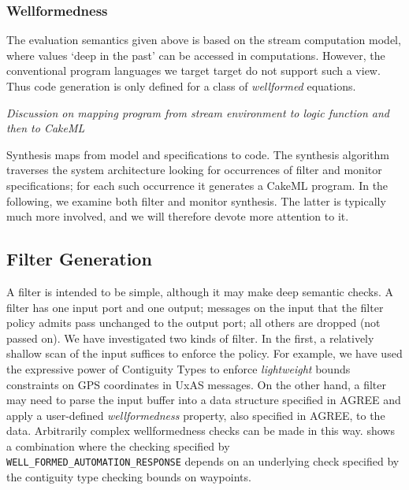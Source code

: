 \subsubsection*{Wellformedness}
The evaluation semantics given above is based on the stream
computation model, where values `deep in the past' can be accessed in
computations. However, the conventional program languages we target
target do not support such a view. Thus code generation is only
defined for a class of \emph{wellformed} equations.

\begin{definition}[Wellformedness]
\end{definition}

\emph{Discussion on mapping program from stream environment to logic function
and then to CakeML}

Synthesis maps from model and specifications to code. The synthesis
algorithm traverses the system architecture looking for occurrences of
filter and monitor specifications;  for each such occurrence it
generates a CakeML program. In the following, we examine both filter
and monitor synthesis. The latter is typically much more involved, and
we will therefore devote more attention to it.

\subsection{Filter Generation}

A filter is intended to be simple, although it may make deep semantic
checks. A filter has one input port and one output; messages on the
input that the filter policy admits pass unchanged to the output port;
all others are dropped (not passed on). We have investigated two kinds
of filter. In the first, a relatively shallow scan of the input
suffices to enforce the policy. For example, we have used the
expressive power of Contiguity Types \cite{contiguity-types} to
enforce \emph{lightweight} bounds constraints on GPS coordinates in
UxAS messages. On the other hand, a filter may need to parse the input
buffer into a data structure specified in AGREE and apply a
user-defined \emph{wellformedness} property, also specified in AGREE,
to the data. Arbitrarily complex wellformedness checks can be made in
this way.  shows a combination where the
checking specified by {\small\verb+WELL_FORMED_AUTOMATION_RESPONSE+}
depends on an underlying check specified by the contiguity type
checking bounds on waypoints.


